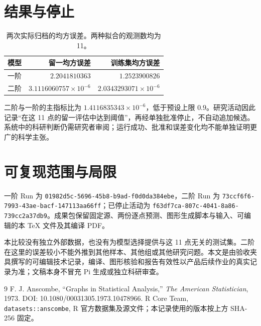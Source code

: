 \documentclass[a4paper,11pt]{article}
\begin{document}
\section{结果与停止}
\begin{table}[htbp]
\centering
\caption{两次实际归档的均方误差。两种拟合的观测数均为 11。}
\begin{tabular}{lrr}
\toprule
模型 & 留一均方误差 & 训练集均方误差 \\
\midrule
一阶 & $2.2041810363$ & $1.2523900826$ \\
二阶 & $3.1116060757\times10^{-6}$ & $2.0343293071\times10^{-6}$ \\
\bottomrule
\end{tabular}
\end{table}
二阶与一阶的主指标比为 $1.4116835343\times10^{-6}$，低于预设上限 $0.9$。研究活动因此记录“在这 11 点的留一评估中达到阈值”，再经单独批准停止，不自动追加候选。系统中的科研判断仍需研究者审阅；运行成功、批准和误差变化均不能单独证明更广的科学主张。

\section{可复现范围与局限}
一阶 Run 为 \texttt{01982d5c-5696-45b8-b9ad-f0d0da384ebe}，二阶 Run 为 \texttt{73ccf6f6-7993-43ae-bacf-147113aa66ff}；已停止活动为 \texttt{f63df7ca-807c-4041-8a86-739cc2a37db9}。成果包保留固定源、两份逐点预测、图形生成脚本与输入、可编辑的本 \TeX{} 文件及其编译 PDF。

本比较没有独立外部数据，也没有为模型选择提供与这 11 点无关的测试集。二阶在这里的误差较小不能外推到其他样本、其他组或其他研究问题。本文是由验收夹具撰写的可编辑技术记录，编译、图形核验和报告有效性以产品后续作业的真实记录为准；文稿本身不冒充 Pi 生成或独立科研审查。

\begin{thebibliography}{9}
 F. J. Anscombe, ``Graphs in Statistical Analysis,'' \emph{The American Statistician}, 1973. DOI: 10.1080/00031305.1973.10478966.
 R Core Team, \texttt{datasets::anscombe}, R 官方数据集及源文件；本记录使用的版本按上方 SHA-256 固定。
\end{thebibliography}
\end{document}
